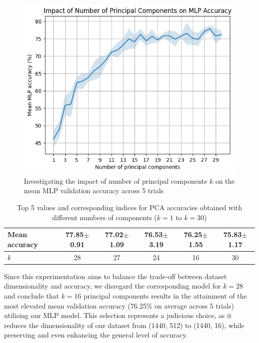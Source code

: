 \documentclass[11pt, a4paper]{report}
\begin{document}
\begin{figure}[H]
    \centering
    \includegraphics[scale=0.55]{docs/Project Report/Media/5_4_1_mlp_pca_accuracy_analysis.png}
    \caption{Investigating the impact of number of principal components $k$ on the mean MLP validation accuracy across 5 trials}
    \label{fig:5.5}
\end{figure}
\begin{table}[H]
    \centering
    \begin{tabular}{lccccc}
        \toprule
        Mean accuracy & 77.85$\pm$0.91 & 77.02$\pm$1.09 & 76.53$\pm$3.19 & 76.25$\pm$1.55 & 75.83$\pm$1.17 \\
        \midrule
        $k$ & 28 & 27 & 24 & 16 & 30 \\
        \bottomrule
    \end{tabular}
    \caption{Top 5 values and corresponding indices for PCA accuracies obtained with different numbers of components ($k=1$ to $k=30$)}
    \label{tb:5.4}
\end{table}
Since this experimentation aims to balance the trade-off between dataset dimensionality and accuracy, we disregard the corresponding model for $k=28$ and conclude that $k=16$ principal components results in the attainment of the most elevated mean validation accuracy (76.25\% on average across 5 trials) utilising our MLP model. This selection represents a judicious choice, as it reduces the dimensionality of our dataset from (1440, 512) to (1440, 16), while preserving and even enhancing the general level of accuracy.
\end{document}
